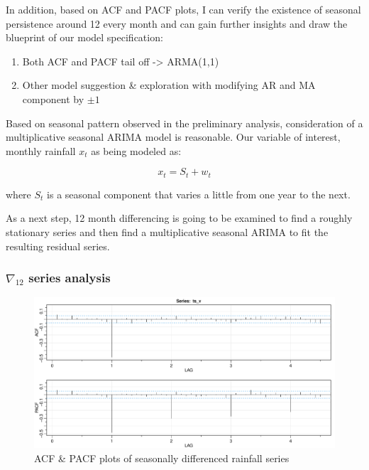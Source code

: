 \documentclass[
  11pt,
]{article}
\providecommand{\tightlist}{%
  \setlength{\itemsep}{0pt}\setlength{\parskip}{0pt}}
\begin{document}
In addition, based on ACF and PACF plots, I can verify the existence of
seasonal persistence around 12 every month and can gain further insights
and draw the blueprint of our model specification:

\begin{enumerate}
\def\labelenumi{\arabic{enumi}.}
\tightlist
\item
  Both ACF and PACF tail off -\textgreater{} ARMA(1,1)
\item
  Other model suggestion \& exploration with modifying AR and MA
  component by \(\pm1\)
\end{enumerate}

Based on seasonal pattern observed in the preliminary analysis,
consideration of a multiplicative seasonal ARIMA model is reasonable.
Our variable of interest, monthly rainfall \(x_t\) as being modeled as:

\[x_t = S_t + w_t\]

where \(S_t\) is a seasonal component that varies a little from one year
to the next.

As a next step, 12 month differencing is going to be examined to find a
roughly stationary series and then find a multiplicative seasonal ARIMA
to fit the resulting residual series.

\newpage

\hypertarget{nabla_12-series-analysis-1}{%
\subsubsection{\texorpdfstring{\(\nabla_{12}\) series
analysis}{\textbackslash nabla\_\{12\} series analysis}}\label{nabla_12-series-analysis-1}}

\begin{figure}
\centering
\includegraphics{ST422_files/figure-latex/unnamed-chunk-23-1.pdf}
\caption{ACF \& PACF plots of seasonally differenced rainfall series}
\end{figure}
\end{document}
